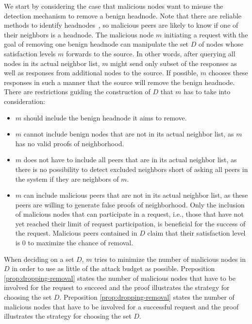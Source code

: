 We start by considering the case that malicious nodes want to misuse the detection mechanism to remove a benign headnode. 
Note that there are reliable methods to identify headnodes~\cite{nguyen2016swap}, so malicious peers are likely to know if one of their neighbors is a headnode.  
The malicious node $m$ initiating a request with the goal of removing one benign headnode can manipulate the set $D$ of nodes whose satisfaction levels $m$ forwards to the source. 
In other words, after querying all nodes in its actual neighbor list, $m$ might send only  subset of the responses as well as responses from additional nodes to the source. If possible, $m$ chooses these responses in such a manner that the source will remove the benign headnode. 
There are restrictions guiding the construction of $D$ that $m$ has to take into consideration:
\begin{itemize}
\item $m$ should include the benign headnode it aims to remove. 
\item $m$ cannot include benign nodes that are not in its actual neighbor list, as $m$ has no valid proofs of neighborhood. 
\item $m$ does not have to include all peers that are in its actual neighbor list, as there is no possibility to detect excluded neighbors short of asking all peers in the system if they are neighbors of $m$. 
\item $m$ can include malicious peers that are not in its actual neighbor list, as these peers are willing to generate false proofs of neighborhood. Only the inclusion of malicious nodes that can participate in a \drop request, i.e., those that have not yet reached their limit of \drop request participation, is beneficial for the success of the request. Malicious peers contained in $D$ claim that their satisfaction level is 0 to maximize the chance of removal. 
\end{itemize}

When deciding on a set $D$, $m$ tries to minimize the number of malicious nodes in $D$ in order to use as little of the attack budget as possible. 
Preposition \ref{prop:dropping-removal} states the number of malicious nodes that have to be involved for the request to succeed and the proof illustrates the strategy for choosing the set $D$. 
Preposition \ref{prop:dropping-removal} states the number of malicious nodes that have to be involved for a successful request and the proof illustrates the strategy for choosing the set $D$. 

